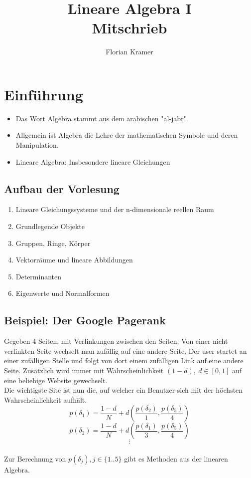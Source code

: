 \documentclass{article}
\title{Lineare Algebra I\\Mitschrieb}
\author{Florian Kramer}
\begin{document}
\maketitle
\tableofcontents
\pagebreak

\section{Einführung}
\begin{itemize}
\item{Das Wort Algebra stammt aus dem arabischen "al-jabr".}
\item{Allgemein ist Algebra die Lehre der mathematischen Symbole und deren Manipulation.}
\item{Lineare Algebra: Insbesondere lineare Gleichungen}
\end{itemize}

\subsection{Aufbau der Vorlesung}
\begin{enumerate}
\item{Lineare Gleichungssysteme und der n-dimensionale reellen Raum}
\item{Grundlegende Objekte}
\item{Gruppen, Ringe, Körper}
\item{Vektorräume und lineare Abbildungen}
\item{Determinanten}
\item{Eigenwerte und Normalformen}
\end{enumerate}

\subsection{Beispiel: Der Google Pagerank}
Gegeben 4 Seiten, mit Verlinkungen zwischen den Seiten. Von einer nicht  verlinkten Seite wechselt man zufällig auf eine andere Seite. Der user startet an einer zufälligen Stelle und folgt von dort einem zufälligen Link auf eine andere Seite. Zusätzlich wird immer mit Wahrscheinlichkeit $(1-d), \ d \in [0, 1]$ auf eine beliebige Website gewechselt.\\
Die wichtigste Site ist nun die, auf welcher ein Benutzer sich mit der höchsten Wahrscheinlichkeit aufhält.\\
$$
p(\delta_1) = \frac{1-d}{N} + d\left(\frac{p(\delta_2)}{1}, \frac{p(\delta_5)}{4}\right)$$$$
p(\delta_2) = \frac{1-d}{N} + d\left(\frac{p(\delta_1)}{3}, \frac{p(\delta_5)}{4}\right)$$$$
\vdots
$$\\
Zur Berechnung von $p(\delta_j), j \in \{1..5\}$ gibt es Methoden aus der linearen Algebra.
\end{document}
